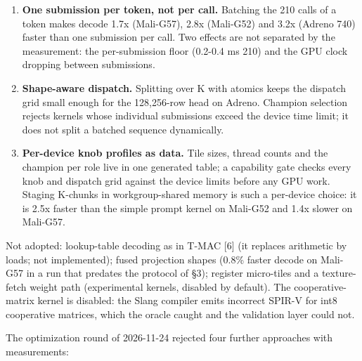 \documentclass[
  10pt,
]{article}
\begin{document}
\begin{enumerate}
  known-answer vector; it has no multi-token or real-weight lane).
\item
  \textbf{One submission per token, not per call.} Batching the 210
  calls of a token makes decode 1.7x (Mali-G57), 2.8x (Mali-G52) and
  3.2x (Adreno 740) faster than one submission per call. Two effects are
  not separated by the measurement: the per-submission floor (0.2-0.4 ms
  \texttimes{} 210) and the GPU clock dropping between submissions.
\item
  \textbf{Shape-aware dispatch.} Splitting over K with atomics keeps the
  dispatch grid small enough for the 128,256-row head on Adreno. Champion
  selection rejects kernels whose individual submissions exceed the device
  time limit; it does not split a batched sequence dynamically.
\item
  \textbf{Per-device knob profiles as data.} Tile sizes, thread counts
  and the champion per role live in one generated table; a capability
  gate checks every knob and dispatch grid against the device limits
  before any GPU work. Staging K-chunks in workgroup-shared memory is
  such a per-device choice: it is 2.5x faster than the simple prompt
  kernel on Mali-G52 and 1.4x slower on Mali-G57.
\end{enumerate}

Not adopted: lookup-table decoding as in T-MAC [6] (it replaces
arithmetic by loads; not implemented); fused projection shapes (0.8\%
faster decode on Mali-G57 in a run that predates the protocol of \S{}3);
register micro-tiles and a texture-fetch weight path (experimental
kernels, disabled by default). The cooperative-matrix kernel is
disabled: the Slang compiler emits incorrect SPIR-V for int8 cooperative
matrices, which the oracle caught and the validation layer could not.

The optimization round of 2026-11-24 rejected four further approaches
with measurements:
\end{document}
